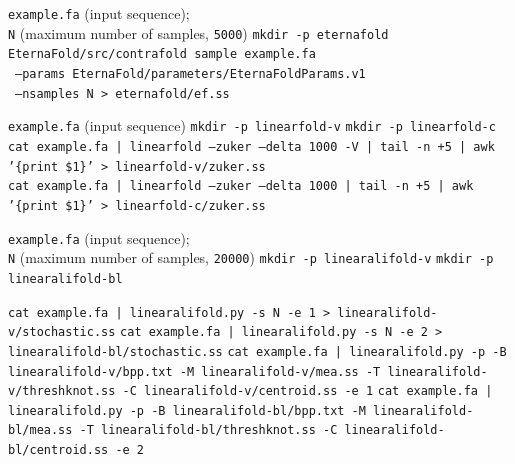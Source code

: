 \documentclass[%
aip,
 amsmath,amssymb,
reprint,%
twocolumn,
]{revtex4-1}
\begin{document}
{\begin{algorithm}[H]
  \caption{Sampling RNA secondary structures with \texttt{EternaFold}}
  \label{alg:eternafold-sampling}
  \begin{algorithmic}[1]
    \REQUIRE \texttt{example.fa} (input sequence);\\
    \texttt{N} (maximum number of samples, \texttt{5000})
    \STATE \texttt{mkdir -p eternafold}
    \STATE \texttt{EternaFold/src/contrafold sample example.fa} \\
    \ \texttt{--params EternaFold/parameters/EternaFoldParams.v1} \\
    \ \texttt{--nsamples N > eternafold/ef.ss}
  \end{algorithmic}
\end{algorithm}

\begin{algorithm}[H]
  \caption{Sampling RNA secondary structures with \texttt{LinearFold}}
  \label{alg:linearfold-sampling}
  \begin{algorithmic}[1]
    \REQUIRE \texttt{example.fa} (input sequence)
    \STATE \texttt{mkdir -p linearfold-v}
    \STATE \texttt{mkdir -p linearfold-c}
    \STATE \texttt{cat example.fa | linearfold --zuker --delta 1000 -V | tail -n +5 | awk '\{print \$1\}' > linearfold-v/zuker.ss} \\
    \STATE \texttt{cat example.fa | linearfold --zuker --delta 1000       | tail -n +5 | awk '\{print \$1\}' > linearfold-c/zuker.ss}
  \end{algorithmic}
\end{algorithm}

\begin{algorithm}[H]
  \caption{Sampling RNA secondary structures with \texttt{LinearAliFold}}
  \label{alg:linearalifold-sampling}
  \begin{algorithmic}[1]
    \REQUIRE \texttt{example.fa} (input sequence);\\
    \texttt{N} (maximum number of samples, \texttt{20000})
    \STATE \texttt{mkdir -p linearalifold-v}
    \STATE \texttt{mkdir -p linearalifold-bl}

    \STATE \texttt{cat example.fa | linearalifold.py -s N -e 1 > linearalifold-v/stochastic.ss}
    \STATE \texttt{cat example.fa | linearalifold.py -s N -e 2 > linearalifold-bl/stochastic.ss}
    \STATE \texttt{cat example.fa | linearalifold.py -p -B linearalifold-v/bpp.txt -M linearalifold-v/mea.ss -T linearalifold-v/threshknot.ss -C linearalifold-v/centroid.ss -e 1}
    \STATE \texttt{cat example.fa | linearalifold.py -p -B linearalifold-bl/bpp.txt -M linearalifold-bl/mea.ss -T linearalifold-bl/threshknot.ss -C linearalifold-bl/centroid.ss -e 2}
  \end{algorithmic}
\end{algorithm}

}
\end{document}
